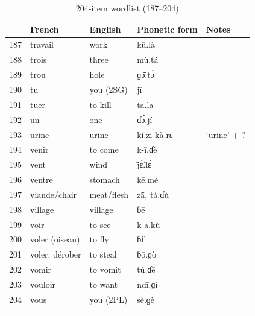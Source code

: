 \documentclass[output=paper,colorlinks,citecolor=brown
]{langscibook}
\begin{document}
\begin{paperappendix}
\newpage

\begin{table}
\caption{204-item wordlist (187–204)}
\label{tab:olson:wordlist7}
 \begin{tabularx}{\textwidth}{lllll}
  \lsptoprule
 & French & English & Phonetic form & Notes \\
  \midrule
187	& travail & work & kū.là & \\
188	& trois & three & mù.tá & \\
189	& trou & hole & ɡɔ̄.tɔ̀ & \\
190	& tu & you (2SG) & jī & \\
191	& tuer & to kill & tā.lā & \\
192	& un & one & ɗɔ́.jí & \\
193	& urine & urine & kí.zī kà.rɛ̄ & ‘urine’ + ? \\
194	& venir & to come & k-ī.ɗè & \\
195	& vent & wind & j̃ɛ̃́.lɛ̀ & \\
196	& ventre & stomach & kē.mè & \\
197	& viande/chair & meat/flesh & zã̄, tá.ɗù & \\
198	& village & village & ɓē & \\
199	& voir & to see & k-ā.kù & \\
200	& voler (oiseau) & to fly & ɓi᷆ & \\
201	& voler; dérober & to steal & ɓō.ɡò & \\
202	& vomir & to vomit & tú.ɗē & \\
203	& vouloir & to want & ndī.ɡì & \\
204	& vous & you (2PL) & sè.ɡè & \\
  \lspbottomrule
 \end{tabularx}
\end{table}

\end{paperappendix}
\end{document}
